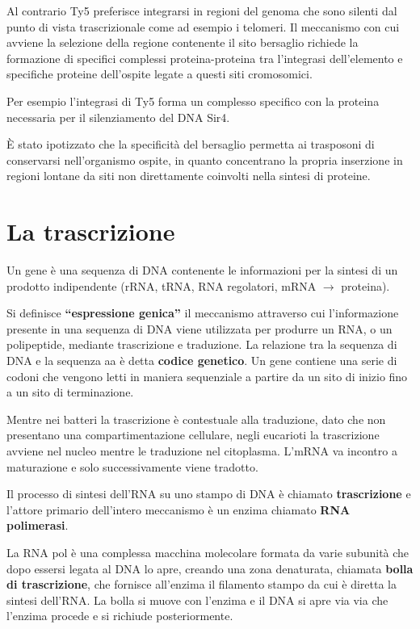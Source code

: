 \documentclass[11pt]{book}
\begin{document}
Al contrario Ty5 preferisce integrarsi in regioni del genoma che sono
silenti dal punto di vista trascrizionale come ad esempio i telomeri. Il
meccanismo con cui avviene la selezione della regione contenente il sito
bersaglio richiede la formazione di specifici complessi
proteina-proteina tra l'integrasi dell'elemento e specifiche proteine
dell'ospite legate a questi siti cromosomici.

Per esempio l'integrasi di Ty5 forma un complesso specifico con la
proteina necessaria per il silenziamento del DNA Sir4.

È stato ipotizzato che la specificità del bersaglio permetta ai
trasposoni di conservarsi nell'organismo ospite, in quanto concentrano
la propria inserzione in regioni lontane da siti non direttamente
coinvolti nella sintesi di proteine.

\chapter{La trascrizione}\label{la-trascrizione}

Un gene è una sequenza di DNA contenente le informazioni per la sintesi
di un prodotto indipendente (rRNA, tRNA, RNA regolatori, mRNA
\(\rightarrow\) proteina).

Si definisce \textbf{``espressione genica''} il meccanismo attraverso
cui l'informazione presente in una sequenza di DNA viene utilizzata per
produrre un RNA, o un polipeptide, mediante trascrizione e traduzione.
La relazione tra la sequenza di DNA e la sequenza aa è detta
\textbf{codice genetico}. Un gene contiene una serie di codoni che
vengono letti in maniera sequenziale a partire da un sito di inizio fino
a un sito di terminazione.

Mentre nei batteri la trascrizione è contestuale alla traduzione, dato
che non presentano una compartimentazione cellulare, negli eucarioti la
trascrizione avviene nel nucleo mentre le traduzione nel citoplasma.
L'mRNA va incontro a maturazione e solo successivamente viene tradotto.

Il processo di sintesi dell'RNA su uno stampo di DNA è chiamato
\textbf{trascrizione} e l'attore primario dell'intero meccanismo è un
enzima chiamato \textbf{RNA polimerasi}.

La RNA pol è una complessa macchina molecolare formata da varie subunità
che dopo essersi legata al DNA lo apre, creando una zona denaturata,
chiamata \textbf{bolla di trascrizione}, che fornisce all'enzima il
filamento stampo da cui è diretta la sintesi dell'RNA. La bolla si muove
con l'enzima e il DNA si apre via via che l'enzima procede e si richiude
posteriormente.
\end{document}
